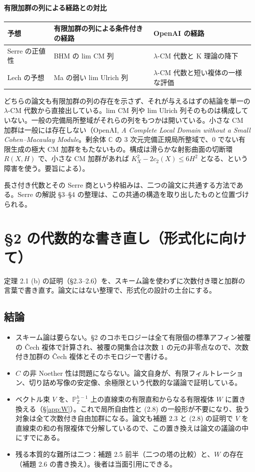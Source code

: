 \documentclass[11pt,a4paper]{ltjsarticle}
\theoremstyle{plain}
\theoremstyle{definition}
\newcommand{\Z}{\mathbb{Z}}
\newcommand{\PP}{\mathbb{P}}
\begin{document}
\paragraph{有限加群の列による経路との対比}
\begin{center}
\begin{tabular}{lll}
\toprule
予想 & 有限加群の列による条件付きの経路 & OpenAI の経路 \\
\midrule
Serre の正値性 & BHM の lim CM 列 & $\lambda$-CM 代数と K 理論の降下 \\
Lech の予想 & Ma の弱い lim Ulrich 列 & $\lambda$-CM 代数と短い複体の一様な評価 \\
\bottomrule
\end{tabular}
\end{center}
どちらの論文も有限加群の列の存在を示さず、それが与えるはずの結論を単一の $\lambda$-CM 代数から直接出している。lim CM 列や lim Ulrich 列そのものは構成していない。一般の完備局所整域がそれらの列をもつかは開いている。小さな CM 加群は一般には存在しない（OpenAI, \emph{A Complete Local Domain without a Small Cohen--Macaulay Module}。剰余体 $\mathbb{C}$ の $3$ 次元完備正規局所整域で、$0$ でない有限生成の極大 CM 加群をもたないもの。構成は滑らかな射影曲面の切断環 $R(X,H)$ で、小さな CM 加群があれば $K_X^2-2c_2(X)\le6H^2$ となる、という障害を使う。要旨による）。

長さ付き代数とその Serre 商という枠組みは、二つの論文に共通する方法である。Serre の解説 \S3--\S4 の整理は、この共通の構造を取り出したものと位置づけられる。

\appendix
\section{\S2 の代数的な書き直し（形式化に向けて）}\label{app:algebraic}

定理 2.1 (b) の証明（\S2.3--2.6）を、スキーム論を使わずに次数付き環と加群の言葉で書き直す。論文にはない整理で、形式化の設計の土台にする。

\subsection{結論}
\begin{itemize}
  \item スキーム論は要らない。\S2 のコホモロジーは全て有限個の標準アフィン被覆の Čech 複体で計算され、被覆の開集合は次数 $1$ の元の非零点なので、次数付き加群の Čech 複体とそのホモロジーで書ける。
  \item $C$ の非 Noether 性は問題にならない。論文自身が、有限フィルトレーション、切り詰め写像の安定像、余極限という代数的な議論で証明している。
  \item ベクトル束 $V$ を、$\PP^{h-1}_\Z$ 上の直線束の有限直和からなる有限複体 $W$ に置き換える（\S\ref{app:W}）。これで局所自由性と (2.8) の一般形が不要になり、扱う対象は全て次数付き自由加群になる。論文も補題 2.3 と (2.8) の証明で $V$ を直線束の和の有限複体で分解しているので、この置き換えは論文の議論の中にすでにある。
  \item 残る本質的な難所は二つ：補題 2.5 前半（二つの塔の比較）と、$W$ の存在（補題 2.6 の書き換え）。後者は当面引用にできる。
\end{itemize}
\end{document}

